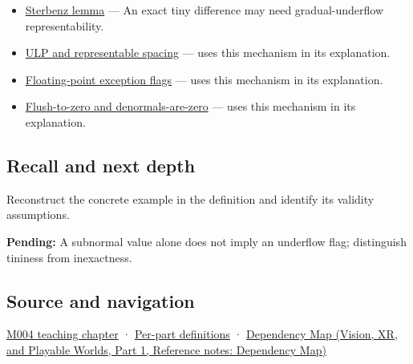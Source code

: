 \hypertarget{appendix-00a6e044c437-used-by}{}

\begin{itemize}
\item
  \hyperref[appendix-399b7ad53f39]{Sterbenz lemma} --- An exact tiny difference may need gradual-underflow representability.
\item
  \hyperref[appendix-14bab4cab9d4]{ULP and representable spacing} --- uses this mechanism in its explanation.
\item
  \hyperref[appendix-ed8531b46754]{Floating-point exception flags} --- uses this mechanism in its explanation.
\item
  \hyperref[appendix-e979eb012782]{Flush-to-zero and denormals-are-zero} --- uses this mechanism in its explanation.
\end{itemize}

\subsection{Recall and next depth}\label{appendix-00a6e044c437-recall-and-next-depth}

\hypertarget{appendix-00a6e044c437-recall-and-next-depth}{}

Reconstruct the concrete example in the definition and identify its validity assumptions.

\textbf{Pending:} A subnormal value alone does not imply an underflow flag; distinguish tininess from inexactness.

\subsection{Source and navigation}\label{appendix-00a6e044c437-source-and-navigation}

\hypertarget{appendix-00a6e044c437-source-and-navigation}{}

\hyperref[01-foundations-i-ch001-a-stretching-ruler-for-real-valued-quantities]{M004 teaching chapter} · \hyperref[appendix-fd090d982a15-m004---parts-61-76]{Per-part definitions} · \href{../07-Vision-XR-and-Playable-Worlds-P01/main.pdf\#appendix-4ad47bdd269a}{Dependency Map (Vision, XR, and Playable Worlds, Part 1, Reference notes: Dependency Map)}
